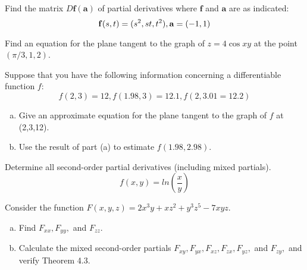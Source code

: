 \documentclass[11pt,letterpaper]{hmcpset}
\begin{document}
	
	\begin{problem}[2.3.33] Find the matrix $D\mathbf{f}(\mathbf{a})$ of partial derivatives where $\mathbf{f}$ and $\mathbf{a}$ are as indicated:
	$$ \mathbf{f}(s,t) = (s^2, st, t^2), \medskip \mathbf{a} = (-1,1)$$
	\end{problem}
	
	\begin{solution}
		\vfill
	\end{solution}
	
	\newpage
	
	\begin{problem}[2.3.38] Find an equation for the plane tangent to the graph of $z = 4\cos{xy}$ at the point $(\pi/3,1,2)$.
	\end{problem}
	
	\begin{solution}
		\vfill
	\end{solution}
	
	\newpage
	
	\begin{problem}[2.3.42] Suppose that you have the following information concerning a differentiable function $f$:
	$$ f(2,3) = 12, f(1.98, 3) = 12.1, f(2, 3.01 = 12.2)$$
	\begin{enumerate}[(a)]
		\item Give an approximate equation for the plane tangent to the graph of $f$ at (2,3,12).
		\item Use the result of part (a) to estimate $f(1.98, 2.98)$.
	\end{enumerate}
	\end{problem}
	
	\begin{solution}
		\vfill
	\end{solution}
	
	\newpage
	
	\begin{problem}[2.4.16] Determine all second-order partial derivatives (including mixed partials).
	$$ f(x,y) = ln\left(\frac{x}{y}\right) $$
	\end{problem}
	
	\begin{solution}
		\vfill
	\end{solution}
	
	\newpage
	
	\begin{problem}[2.4.22] Consider the function $F(x,y,z) = 2x^3y + xz^2 + y^3z^5-7xyz$.
	\begin{enumerate}[(a)]
		\item Find $F_{xx}, F_{yy},$ and $F_{zz}$.
		\item Calculate the mixed second-order partials $F_{xy}, F_{yx}, F_{xz}, F_{zx}, F_{yz},$ and $F_{zy},$ and verify Theorem 4.3.
	\end{enumerate}
	\end{problem}
	
\end{document}
